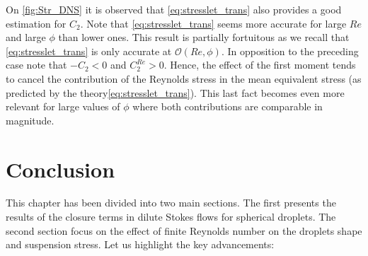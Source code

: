 On \ref{fig:Str_DNS} it is observed that \ref{eq:stresslet_trans} also provides a good estimation for $C_2$. 
Note that \ref{eq:stresslet_trans} seems more accurate for large $Re$ and large $\phi$ than lower ones.
This result is partially fortuitous as we recall that  \ref{eq:stresslet_trans} is only accurate at $\mathcal{O}(Re,\phi)$. 
In opposition to the preceding case note that $ - C_2<0$ and $C_2^{Re} > 0$.  
Hence, the effect of the first moment tends to cancel the contribution of the Reynolds stress in the mean equivalent stress (as predicted by the theory\eqref{eq:stresslet_trans}). 
This last fact becomes even more relevant for large values of $\phi$ where both contributions are comparable in magnitude. 

\section{Conclusion}
This chapter has been divided into two main sections. 
The first presents the results of the closure terms in dilute Stokes flows for spherical droplets. 
The second section focus on the effect of finite Reynolds number on the droplets shape and suspension stress. 
Let us highlight the key advancements:
